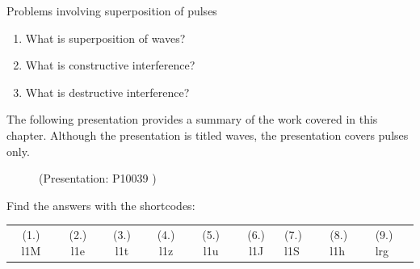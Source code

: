 \begin{exercises}{ Problems involving superposition of pulses }
\begin{enumerate}[noitemsep, label=\textbf{\arabic*}. ]
\begin{figure}[H]
 \end{figure}               \label{m38802*uid62}\item 
          What is superposition of waves?\newline
\label{m38802*uid64}\item What is constructive interference?\newline
\label{m38802*uid65}\item What is destructive interference?\newline
        \end{enumerate}
\label{m38802*fs-id1165499443114} The following presentation provides a summary of the work covered in this chapter. Although the presentation is titled waves, the presentation covers pulses only.
    \setcounter{subfigure}{0}
	\begin{figure}[H] %
    \label{m38802*slidesharemedia}\label{m38802*slideshareflash} { (Presentation:  P10039 )}
      \vspace{2pt}
    \vspace{.1in}
 \end{figure}       
\par 
  \label{m38802*eip-812}
\par {} Find the answers with the shortcodes:
 \par \begin{tabular}[h]{cccccc}
 (1.) l1M  &  (2.) l1e  &  (3.) l1t  &  (4.) l1z  &  (5.) l1u  &  (6.) l1J  &  (7.) l1S  &  (8.) l1h  &  (9.) lrg  & \end{tabular}

\end{exercises}
